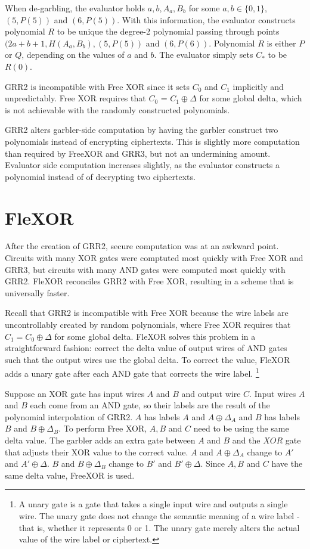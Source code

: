 When de-garbling, the evaluator holds $a, b, A_a, B_b$ for some $a,b \in \{0,1\}$, $(5, P(5))$ and $(6, P(5))$.
With this information, the evaluator constructs polynomial $R$ to be unique the degree-2 polynomial passing through points $(2a + b + 1, H(A_a, B_b), (5, P(5))$ and $(6, P(6))$.
Polynomial $R$ is either $P$ or $Q$, depending on the values of $a$ and $b$.
The evaluator simply sets $C_*$ to be $R(0)$.

GRR2 is incompatible with Free XOR since it sets $C_0$ and $C_1$ implicitly and unpredictably.
Free XOR requires that $C_0$ = $C_1 \oplus \Delta$ for some global delta, which is not achievable with the randomly constructed polynomials.

GRR2 alters garbler-side computation by having the garbler construct two polynomials instead of encrypting ciphertexts.
This is slightly more computation than required by FreeXOR and GRR3, but not an undermining amount.
Evaluator side computation increases slightly, as the evaluator constructs a polynomial instead of of decrypting two ciphertexts.


\section{FleXOR}
After the creation of GRR2, secure computation was at an awkward point.
Circuits with many XOR gates were comptuted most quickly with Free XOR and GRR3, but circuits with many AND gates were computed most quickly with GRR2.
FleXOR reconciles GRR2 with Free XOR, resulting in a scheme that is universally faster.

Recall that GRR2 is incompatible with Free XOR because the wire labels are uncontrollably created by random polynomials, where Free XOR requires that $C_1 = C_0 \oplus \Delta$ for some global delta.
FleXOR solves this problem in a straightforward fashion: correct the delta value of output wires of AND gates such that the output wires use the global delta.
To correct the value, FleXOR adds a unary gate after each AND gate that corrects the wire label. \footnote{A unary gate is a gate that takes a single input wire and outputs a single wire. The unary gate does not change the semantic meaning of a wire label - that is, whether it represents 0 or 1. The unary gate merely alters the actual value of the wire label or ciphertext.}

Suppose an XOR gate has input wires $A$ and $B$ and output wire $C$.
Input wires $A$ and $B$ each come from an AND gate, so their labels are the result of the polynomial interpolation of GRR2.
$A$ has labels $A$ and $A \oplus \Delta_A$ and $B$ has labels $B$ and $B \oplus \Delta_B$.
To perform Free XOR, $A,B$ and $C$ need to be using the same delta value. 
The garbler adds an extra gate between $A$ and $B$ and the $XOR$ gate that adjusts their XOR value to the correct value.
$A$ and $A \oplus \Delta_A$ change to $A'$ and $A' \oplus \Delta$.
$B$ and $B \oplus \Delta_B$ change to $B'$ and $B' \oplus \Delta$.
Since $A, B$ and $C$ have the same delta value, FreeXOR is used.

